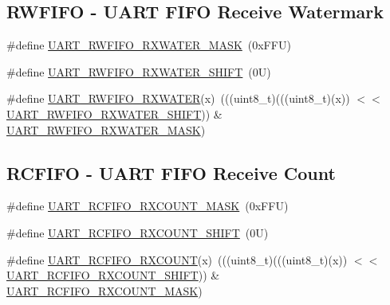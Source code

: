 \subsection*{R\+W\+F\+I\+FO -\/ U\+A\+RT F\+I\+FO Receive Watermark}
\begin{DoxyCompactItemize}
\item 
\#define \mbox{\hyperlink{group___u_a_r_t___register___masks_ga94cd69bba6b852fbd438b8b4b1ab1372}{U\+A\+R\+T\+\_\+\+R\+W\+F\+I\+F\+O\+\_\+\+R\+X\+W\+A\+T\+E\+R\+\_\+\+M\+A\+SK}}~(0x\+F\+F\+U)
\item 
\#define \mbox{\hyperlink{group___u_a_r_t___register___masks_ga76a2717965f398da28aadbbebfafa2c8}{U\+A\+R\+T\+\_\+\+R\+W\+F\+I\+F\+O\+\_\+\+R\+X\+W\+A\+T\+E\+R\+\_\+\+S\+H\+I\+FT}}~(0\+U)
\item 
\#define \mbox{\hyperlink{group___u_a_r_t___register___masks_ga76c4f184df06a869746af551b84e5105}{U\+A\+R\+T\+\_\+\+R\+W\+F\+I\+F\+O\+\_\+\+R\+X\+W\+A\+T\+ER}}(x)~(((uint8\+\_\+t)(((uint8\+\_\+t)(x)) $<$$<$ \mbox{\hyperlink{group___u_a_r_t___register___masks_ga76a2717965f398da28aadbbebfafa2c8}{U\+A\+R\+T\+\_\+\+R\+W\+F\+I\+F\+O\+\_\+\+R\+X\+W\+A\+T\+E\+R\+\_\+\+S\+H\+I\+FT}})) \& \mbox{\hyperlink{group___u_a_r_t___register___masks_ga94cd69bba6b852fbd438b8b4b1ab1372}{U\+A\+R\+T\+\_\+\+R\+W\+F\+I\+F\+O\+\_\+\+R\+X\+W\+A\+T\+E\+R\+\_\+\+M\+A\+SK}})
\end{DoxyCompactItemize}
\subsection*{R\+C\+F\+I\+FO -\/ U\+A\+RT F\+I\+FO Receive Count}
\begin{DoxyCompactItemize}
\item 
\#define \mbox{\hyperlink{group___u_a_r_t___register___masks_gad56c1815bb877b0a82dcabc58b780b54}{U\+A\+R\+T\+\_\+\+R\+C\+F\+I\+F\+O\+\_\+\+R\+X\+C\+O\+U\+N\+T\+\_\+\+M\+A\+SK}}~(0x\+F\+F\+U)
\item 
\#define \mbox{\hyperlink{group___u_a_r_t___register___masks_gaf167fbdec63bf8287e0c1fa12ad7f39f}{U\+A\+R\+T\+\_\+\+R\+C\+F\+I\+F\+O\+\_\+\+R\+X\+C\+O\+U\+N\+T\+\_\+\+S\+H\+I\+FT}}~(0\+U)
\item 
\#define \mbox{\hyperlink{group___u_a_r_t___register___masks_gab386960a2ffd4a878651b2b8072c2756}{U\+A\+R\+T\+\_\+\+R\+C\+F\+I\+F\+O\+\_\+\+R\+X\+C\+O\+U\+NT}}(x)~(((uint8\+\_\+t)(((uint8\+\_\+t)(x)) $<$$<$ \mbox{\hyperlink{group___u_a_r_t___register___masks_gaf167fbdec63bf8287e0c1fa12ad7f39f}{U\+A\+R\+T\+\_\+\+R\+C\+F\+I\+F\+O\+\_\+\+R\+X\+C\+O\+U\+N\+T\+\_\+\+S\+H\+I\+FT}})) \& \mbox{\hyperlink{group___u_a_r_t___register___masks_gad56c1815bb877b0a82dcabc58b780b54}{U\+A\+R\+T\+\_\+\+R\+C\+F\+I\+F\+O\+\_\+\+R\+X\+C\+O\+U\+N\+T\+\_\+\+M\+A\+SK}})
\end{DoxyCompactItemize}
